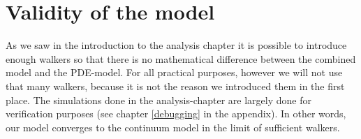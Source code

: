 \section{Validity of the model}
As we saw in the introduction to the analysis chapter it is possible to introduce enough walkers so that there is no mathematical difference between the combined model and the PDE-model. 
For all practical purposes, however we will not use that many walkers, because it is not the reason we introduced them in the first place. 
The simulations done in the analysis-chapter are largely done for verification purposes (see chapter \ref{debugging} in the appendix).
In other words, our model converges to the continuum model in the limit of sufficient walkers.

